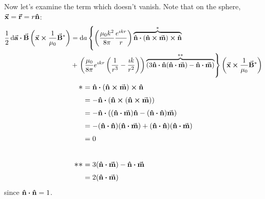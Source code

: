 \documentclass[a4paper,twoside]{article}
\begin{document}
\begin{itemize}
\begin{problem}
            Now let's examine the term which doesn't vanish. Note that on the sphere, $ \va{x} = \va{r} = r \vu{n} $:
            \begin{align}
                \frac{1}{2}\dd{ \va{a}} \vdot \va{B} \left( \va{x} \cross \frac{1}{\mu_0} \va{B}^* \right) &= \dd{a}\left\{ \left( \frac{\mu_0 k^2}{8 \pi} \frac{e^{\imath kr}}{r} \right) \overbrace{\vu{n} \vdot (\vu{n} \cross \va{m}) \cross \vu{n}}^{\ast} \right. \\
                &+ \left. \left( \frac{\mu_0}{8 \pi} e^{\imath kr} \left( \frac{1}{r^3} - \frac{\imath k}{r^2} \right) \right) \overbrace{(3 \vu{n} \vdot \vu{n} (\vu{n} \vdot \va{m}) - \vu{n} \vdot \va{m})}^{\ast\ast}\right\} \left( \va{x} \cross \frac{1}{\mu_0} \va{B}^*\right)
            \end{align}
            \begin{align}
                \mathlarger{\ast} &= \vu{n} \vdot (\vu{n} \cross \va{m}) \cross \vu{n} \\
                &= - \vu{n} \vdot (\vu{n} \cross (\vu{n} \cross \va{m})) \\
                &= - \vu{n} \vdot ( (\vu{n} \vdot \va{m}) \vu{n} - (\vu{n} \vdot \vu{n}) \va{m}) \\
                &= - ( \vu{n} \vdot \vu{n})( \vu{n} \vdot \va{m}) + ( \vu{n} \vdot \vu{n}) ( \vu{n} \vdot \va{m}) \\
                &= 0\\\\
                \mathlarger{\ast\ast} &= 3 (\vu{n} \vdot \va{m}) - \vu{n} \vdot \va{m} \\
                &= 2( \vu{n} \vdot \va{m})
            \end{align}
            since $ \vu{n} \vdot \vu{n} = 1 $.
            

\end{problem}
\end{itemize}
\end{document}
